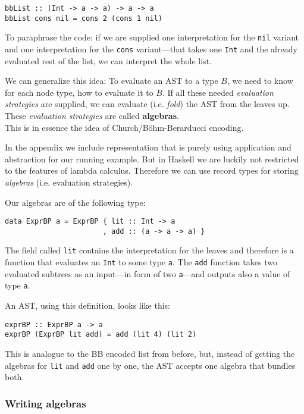 \begin{lstlisting}
bbList :: (Int -> a -> a) -> a -> a
bbList cons nil = cons 2 (cons 1 nil)
\end{lstlisting}

To paraphrase the code: if we are supplied one interpretation for the
\texttt{nil} variant and one interpretation for the \texttt{cons} variant—that
takes one \texttt{Int} and the already evaluated rest of the list, we can
interpret the whole list.

We can generalize this idea: To evaluate an AST to a type $B$, we need to know
for each node type, how to evaluate it to $B$. If all these needed
\emph{evaluation strategies} are supplied, we can evaluate (i.e. \emph{fold})
the AST from the leaves up. These \emph{evaluation strategies} are called
\textbf{algebras}.\\
This is in essence the idea of Church/Böhm-Berarducci encoding.

In the appendix we include representation that is purely using application and
abstraction for our running example. But in Haskell we are luckily not
restricted to the features of lambda calculus. Therefore we can use record types
for storing \emph{algebras} (i.e. evaluation strategies).

Our algebras are of the following type:

\begin{lstlisting}
data ExprBP a = ExprBP { lit :: Int -> a
                       , add :: (a -> a -> a) }
\end{lstlisting}

The field called \texttt{lit} contains the interpretation for the leaves and
therefore is a function that evaluates an \texttt{Int} to some type \texttt{a}.
The \texttt{add} function takes two evaluated subtrees as an input—in form of
two \texttt{a}—and outputs also a value of type \texttt{a}.

An AST, using this definition, looks like this:

\begin{lstlisting}
exprBP :: ExprBP a -> a
exprBP (ExprBP lit add) = add (lit 4) (lit 2)
\end{lstlisting}

This is analogue to the BB encoded list from before, but, instead of getting
the algebras for \texttt{lit} and \texttt{add} one by one, the AST accepts one
algebra that bundles both.

\subsubsection{Writing algebras}

